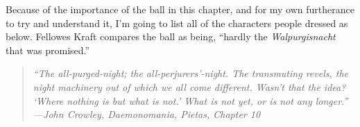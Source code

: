 \documentclass[10pt,makeidx]{extreport}
\begin{document}
\begin{tcolorbox}[breakout, title={Ball: Costumes \& Sightings}]
\noindent Because of the importance of the ball in this chapter, and for my own furtherance to try and understand it, I'm going to list all of the characters people dressed as below. Fellowes Kraft compares the ball as being, “hardly the \textit{Walpurgisnacht} that was promised.”

\medskip
\begin{quote}\itshape
“The all-purged-night; the all-perjurers’-night. The transmuting revels, the night machinery out of which we all come different. Wasn’t that the idea? ‘Where nothing is but what is not.’ What is not yet, or is not any longer.”\\
\raggedleft —John Crowley, \textit{Daemonomania}, Pietas, Chapter 10
\end{quote}


\end{tcolorbox}
\end{document}
